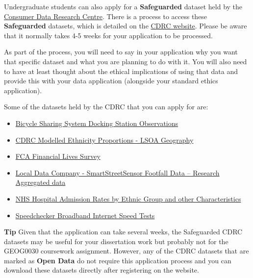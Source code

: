 \documentclass[
]{book}
\providecommand{\tightlist}{%
  \setlength{\itemsep}{0pt}\setlength{\parskip}{0pt}}
\begin{document}
Undergraduate students can also apply for a \textbf{Safeguarded} dataset held by the \href{https://www.cdrc.ac.uk/}{Consumer Data Research Centre}. There is a process to access these \textbf{Safeguarded} datasets, which is detailed on the \href{https://data.cdrc.ac.uk/using-our-data-services}{CDRC website}. Please be aware that it normally takes 4-5 weeks for your application to be processed.

As part of the process, you will need to say in your application why you want that specific dataset and what you are planning to do with it. You will also need to have at least thought about the ethical implications of using that data and provide this with your data application (alongside your standard ethics application).

Some of the datasets held by the CDRC that you can apply for are:

\begin{itemize}
\tightlist
\item
  \href{https://data.cdrc.ac.uk/dataset/bicycle-sharing-system-docking-station-observations}{Bicycle Sharing System Docking Station Observations}
\item
  \href{https://data.cdrc.ac.uk/dataset/cdrc-modelled-ethnicity-proportions-lsoa-geography}{CDRC Modelled Ethnicity Proportions - LSOA Geography}
\item
  \href{https://data.cdrc.ac.uk/dataset/fca-financial-lives-survey}{FCA Financial Lives Survey}
\item
  \href{https://data.cdrc.ac.uk/dataset/local-data-company-smartstreetsensor-footfall-data-\%E2\%80\%93-research-aggregated-data}{Local Data Company - SmartStreetSensor Footfall Data -- Research Aggregated data}
\item
  \href{https://data.cdrc.ac.uk/dataset/nhs-hospital-admission-rates-ethnic-group-and-other-characteristics}{NHS Hospital Admission Rates by Ethnic Group and other Characteristics}
\item
  \href{https://data.cdrc.ac.uk/dataset/speedchecker-broadband-internet-speed-tests}{Speedchecker Broadband Internet Speed Tests}
\end{itemize}

\textbf{Tip}
Given that the application can take several weeks, the Safeguarded CDRC datasets may be useful for your dissertation work but probably not for the GEOG0030 coursework assignment. However, any of the CDRC datasets that are marked as \textbf{Open Data} do not require this application process and you can download these datasets directly after registering on the website.
\end{document}

